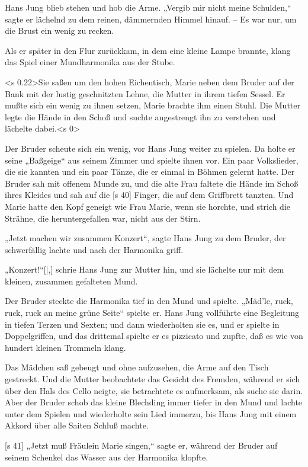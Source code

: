 Hans Jung blieb stehen und hob die Arme.
„Vergib mir nicht meine Schulden,“ sagte er lächelnd
zu dem reinen, dämmernden Himmel hinauf. – Es
war nur, um die Brust ein wenig zu recken.

Als er später in den Flur zurückkam, in dem
eine kleine Lampe brannte, klang das Spiel einer
Mundharmonika aus der Stube.

<s 0.22>Sie saßen um den hohen Eichentisch, Marie neben
dem Bruder auf der Bank mit der lustig geschnitzten
Lehne, die Mutter in ihrem tiefen Sessel. Er mußte
sich ein wenig zu ihnen setzen, Marie brachte ihm
einen Stuhl. Die Mutter legte die Hände in den
Schoß und suchte angestrengt ihn zu verstehen und
lächelte dabei.<s 0>

Der Bruder scheute sich ein wenig, vor Hans
Jung weiter zu spielen. Da holte er seine „Baßgeige“
aus seinem Zimmer und spielte ihnen vor. Ein paar
Volkslieder, die sie kannten und ein paar Tänze,
die er einmal in Böhmen gelernt hatte. Der Bruder
sah mit offenem Munde zu, und die alte Frau faltete
die Hände im Schoß ihres Kleides und sah auf die
[s 40]
Finger, die auf dem Griffbrett tanzten. Und Marie
hatte den Kopf geneigt wie Frau Marie, wenn sie
horchte, und strich die Strähne, die heruntergefallen
war, nicht aus der Stirn.

„Jetzt machen wir zusammen Konzert“, sagte
Hans Jung zu dem Bruder, der schwerfällig lachte
und nach der Harmonika griff.

„Konzert!“[|,] schrie Hans Jung zur Mutter hin,
und sie lächelte nur mit dem kleinen, zusammen­
gefalteten Mund.

Der Bruder steckte die Harmonika tief in den
Mund und spielte. „Mäd'le, ruck, ruck, ruck an meine
grüne Seite“ spielte er. Hans Jung vollführte eine
Begleitung in tiefen Terzen und Sexten; und dann
wiederholten sie es, und er spielte in Doppelgriffen,
und das drittemal spielte er es pizzicato und zupfte,
daß es wie von hundert kleinen Trommeln klang.

Das Mädchen saß gebeugt und ohne aufzusehen,
die Arme auf den Tisch gestreckt. Und die Mutter
beobachtete das Gesicht des Fremden, während er
sich über den Hals des Cello neigte, sie betrachtete
es aufmerksam, als suche sie darin. Aber der Bruder
schob das kleine Blechding immer tiefer in den Mund
und lachte unter dem Spielen und wiederholte sein
Lied immerzu, bis Hans Jung mit einem Akkord über
alle Saiten Schluß machte.

[s 41]
„Jetzt muß Fräulein Marie singen,“ sagte er,
während der Bruder auf seinem Schenkel das Wasser
aus der Harmonika klopfte.


